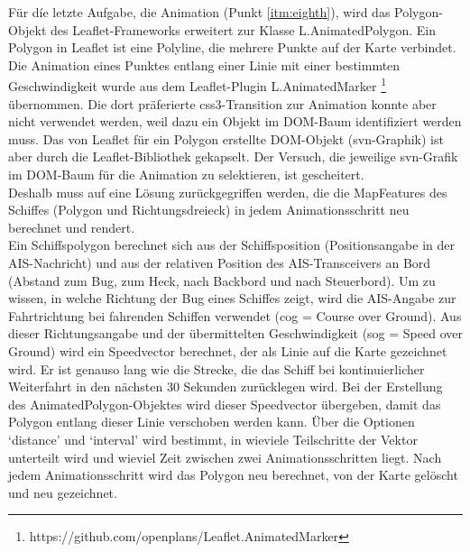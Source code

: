 Für díe letzte Aufgabe, die Animation (Punkt \ref{itm:eighth}), wird das Polygon-Objekt des Leaflet-Frameworks erweitert zur Klasse L.AnimatedPolygon. Ein Polygon in Leaflet ist eine Polyline, die mehrere Punkte auf der Karte verbindet. Die Animation eines Punktes entlang einer Linie mit einer bestimmten Geschwindigkeit wurde aus dem Leaflet-Plugin L.AnimatedMarker \footnote{https://github.com/openplans/Leaflet.AnimatedMarker} übernommen. Die dort präferierte css3-Transition zur Animation konnte aber nicht verwendet werden, weil dazu ein Objekt im DOM-Baum identifiziert werden muss. Das von Leaflet für ein Polygon erstellte DOM-Objekt (svn-Graphik) ist aber durch die Leaflet-Bibliothek gekapselt. Der Versuch, die jeweilige svn-Grafik im DOM-Baum für die Animation zu selektieren, ist gescheitert. \\
Deshalb muss auf eine Lösung zurückgegriffen werden, die die MapFeatures des Schiffes (Polygon und Richtungsdreieck) in jedem Animationsschritt neu berechnet und rendert.\\
Ein Schiffspolygon berechnet sich aus der Schiffsposition (Positionsangabe in der AIS-Nachricht) und aus der relativen Position des AIS-Transceivers an Bord (Abstand zum Bug, zum Heck, nach Backbord und nach Steuerbord). Um zu wissen, in welche Richtung der Bug eines Schiffes zeigt, wird die AIS-Angabe zur Fahrtrichtung  bei fahrenden Schiffen verwendet (cog = Course over Ground). Aus dieser Richtungsangabe und der übermittelten Geschwindigkeit (sog = Speed over Ground) wird ein Speedvector berechnet, der als Linie auf die Karte gezeichnet wird. Er ist genauso lang wie die Strecke, die das Schiff bei kontinuierlicher Weiterfahrt in den nächsten 30 Sekunden zurücklegen wird. Bei der Erstellung des AnimatedPolygon-Objektes wird dieser Speedvector übergeben, damit das Polygon entlang dieser Linie verschoben werden kann. Über die Optionen ‘distance’ und ‘interval’ wird bestimmt, in wieviele Teilschritte der Vektor unterteilt wird und wieviel Zeit zwischen zwei Animationsschritten liegt. Nach jedem Animationsschritt wird das Polygon neu berechnet, von der Karte gelöscht und neu gezeichnet.


